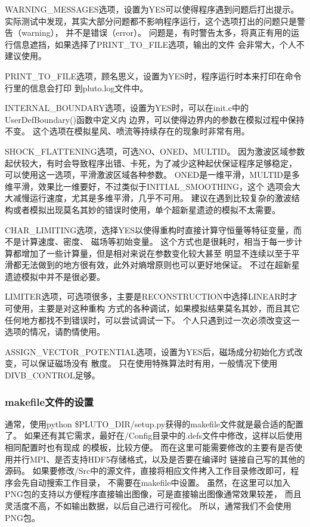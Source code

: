 WARNING\_MESSAGES选项，设置为YES可以使得程序遇到问题后打出提示。
实际测试中发现，其实大部分问题都不影响程序运行，这个选项打出的问题只是警告（warning），
并不是错误（error）。
问题是，有时警告太多，将真正有用的运行信息遮挡，如果选择了PRINT\_TO\_FILE选项，输出的文件
会非常大，个人不建议使用。

PRINT\_TO\_FILE选项，顾名思义，设置为YES时，程序运行时本来打印在命令行里的信息会打印
到pluto.log文件中。

INTERNAL\_BOUNDARY选项，设置为YES时，可以在init.c中的UserDefBoundary()函数中定义内
边界，可以使得边界内的参数在模拟过程中保持不变。
这个选项在模拟星风、喷流等持续存在的现象时非常有用。

SHOCK\_FLATTENING选项，可选NO、ONED、MULTID。
因为激波区域参数起伏较大，有时会导致程序出错、卡死，为了减少这种起伏保证程序足够稳定，
可以使用这一选项，平滑激波区域各种参数。
ONED是一维平滑，MULTID是多维平滑，效果比一维要好，不过类似于INITIAL\_SMOOTHING，这个
选项会大大减慢运行速度，尤其是多维平滑，几乎不可用。
建议在遇到比较复杂的激波结构或者模拟出现莫名其妙的错误时使用，单个超新星遗迹的模拟不太需要。

CHAR\_LIMITING选项，选择YES以使得重构时直接计算守恒量等特征变量，而不是计算速度、密度、
磁场等初始变量。
这个方式也是很耗时，相当于每一步计算都增加了一些计算量，但是相对来说在参数变化较大甚至
明显不连续以至于平滑都无法做到的地方很有效，此外对熵增原则也可以更好地保证。
不过在超新星遗迹模拟中并不是很必要。

LIMITER选项，可选项很多，主要是RECONSTRUCTION中选择LINEAR时才可使用，主要是对这种重构
方式的各种调试，如果模拟结果莫名其妙，而且其它任何地方都找不到错误时，可以尝试调试一下。
个人只遇到过一次必须改变这一选项的情况，请酌情使用。

ASSIGN\_VECTOR\_POTENTIAL选项，设置为YES后，磁场成分初始化方式改变，可以保证磁场没有
散度。
只在使用特殊算法时有用，一般情况下使用DIVB\_CONTROL足够。

\subsubsection{makefile文件的设置}
通常，使用python \$PLUTO\_DIR/setup.py获得的makefile文件就是最合适的配置了。
如果还有其它需求，最好在/Config目录中的.defs文件中修改，这样以后使用相同配置时也有现成
的模板，比较方便。
而在这里可能需要修改的主要有是否使用并行MPI、是否支持HDF5存储格式，以及是否要在编译时
链接自己写的其他的源码。
如果要修改/Src中的源文件，直接将相应文件拷入工作目录修改即可，程序会先自动搜索工作目录，
不需要在makefile中设置。
虽然，在这里可以加入PNG包的支持以方便程序直接输出图像，可是直接输出图像通常效果较差，
而且灵活度不高，不如输出数据，以后自己进行可视化。
所以，通常我们不会使用PNG包。

